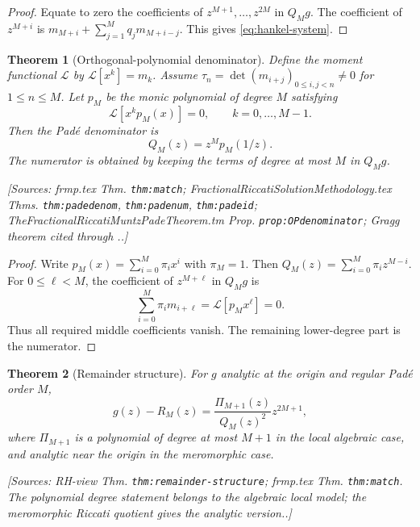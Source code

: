 \documentclass[11pt]{article}
\newtheorem{theorem}{Theorem}[section]
\theoremstyle{definition}
\newcommand{\Lc}{\mathcal{L}}
\newcommand{\Source}[1]{\par\smallskip\noindent\textup{[Sources: #1.]}}
\begin{document}
\begin{proof}
Equate to zero the coefficients of $z^{M+1},\ldots,z^{2M}$ in $Q_Mg$.
The coefficient of $z^{M+i}$ is $m_{M+i}+\sum_{j=1}^Mq_jm_{M+i-j}$.
This gives \eqref{eq:hankel-system}.
\end{proof}

\begin{theorem}[Orthogonal-polynomial denominator]\label{thm:op-denominator}
Define the moment functional $\Lc$ by $\Lc[x^k]=m_k$.
Assume $\tau_n=\det(m_{i+j})_{0\le i,j<n}\ne0$ for $1\le n\le M$.
Let $p_M$ be the monic polynomial of degree $M$ satisfying
\begin{equation}\label{eq:op-orth}
        \Lc[x^kp_M(x)]=0,
        \qquad k=0,\ldots,M-1.
\end{equation}
Then the Padé denominator is
\begin{equation}\label{eq:den-reversal}
        Q_M(z)=z^Mp_M(1/z).
\end{equation}
The numerator is obtained by keeping the terms of degree at most $M$ in $Q_Mg$.
\Source{frmp.tex Thm. \texttt{thm:match}; FractionalRiccatiSolutionMethodology.tex Thms. \texttt{thm:padedenom}, \texttt{thm:padenum}, \texttt{thm:padeid}; TheFractionalRiccatiMuntzPadeTheorem.tm Prop. \texttt{prop:OPdenominator}; Gragg theorem cited through \cite{graggThePadeTableAndItsRelationToCertainAlgorithms}.}
\end{theorem}

\begin{proof}
Write $p_M(x)=\sum_{i=0}^M\pi_ix^i$ with $\pi_M=1$.
Then $Q_M(z)=\sum_{i=0}^M\pi_i z^{M-i}$.
For $0\le\ell<M$,
the coefficient of $z^{M+\ell}$ in $Q_Mg$ is
\[
        \sum_{i=0}^M\pi_i m_{i+\ell}=\Lc[p_Mx^\ell]=0.
\]
Thus all required middle coefficients vanish.
The remaining lower-degree part is the numerator.
\end{proof}

\begin{theorem}[Remainder structure]\label{thm:remainder}
For $g$ analytic at the origin and regular Padé order $M$,
\begin{equation}\label{eq:remainder}
        g(z)-R_M(z)=\frac{\Pi_{M+1}(z)}{Q_M(z)^2}z^{2M+1},
\end{equation}
where $\Pi_{M+1}$ is a polynomial of degree at most $M+1$ in the local algebraic case,
and analytic near the origin in the meromorphic case.
\Source{RH-view Thm. \texttt{thm:remainder-structure}; frmp.tex Thm. \texttt{thm:match}. The polynomial degree statement belongs to the algebraic local model; the meromorphic Riccati quotient gives the analytic version.}
\end{theorem}
\end{document}

